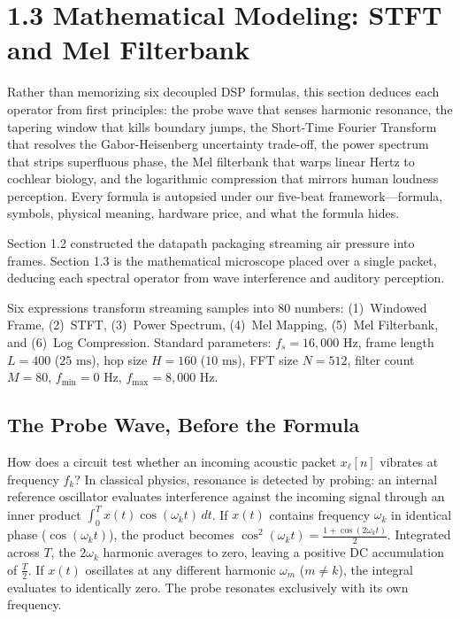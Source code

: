 \documentclass[11pt,a4paper]{article}
\begin{document}
\vspace*{-4.5mm}
\section*{1.3 Mathematical Modeling: STFT and Mel Filterbank}
\vspace{-2.5mm}

\begin{learningobj}
Rather than memorizing six decoupled DSP formulas, this section deduces each operator from first principles: the probe wave that senses harmonic resonance, the tapering window that kills boundary jumps, the Short-Time Fourier Transform that resolves the Gabor-Heisenberg uncertainty trade-off, the power spectrum that strips superfluous phase, the Mel filterbank that warps linear Hertz to cochlear biology, and the logarithmic compression that mirrors human loudness perception. Every formula is autopsied under our five-beat framework---formula, symbols, physical meaning, hardware price, and what the formula hides.
\end{learningobj}

\vspace{0.5mm}
Section 1.2 constructed the datapath packaging streaming air pressure into frames. Section 1.3 is the mathematical microscope placed over a single packet, deducing each spectral operator from wave interference and auditory perception.

Six expressions transform streaming samples into 80 numbers: (1)~Windowed Frame, (2)~STFT, (3)~Power Spectrum, (4)~Mel Mapping, (5)~Mel Filterbank, and (6)~Log Compression. Standard parameters: $f_s = 16{,}000\text{ Hz}$, frame length $L = 400$ ($25\text{ ms}$), hop size $H = 160$ ($10\text{ ms}$), FFT size $N = 512$, filter count $M = 80$, $f_{\min} = 0\text{ Hz}$, $f_{\max} = 8{,}000\text{ Hz}$.

\vspace{-1.5mm}
\subsection*{The Probe Wave, Before the Formula}
\vspace{-2mm}

How does a circuit test whether an incoming acoustic packet $x_\ell[n]$ vibrates at frequency $f_k$? In classical physics, resonance is detected by probing: an internal reference oscillator evaluates interference against the incoming signal through an inner product $\int_0^T x(t) \cos(\omega_k t) \, dt$. If $x(t)$ contains frequency $\omega_k$ in identical phase ($\cos(\omega_k t)$), the product becomes $\cos^2(\omega_k t) = \frac{1 + \cos(2\omega_k t)}{2}$. Integrated across $T$, the $2\omega_k$ harmonic averages to zero, leaving a positive DC accumulation of $\frac{T}{2}$. If $x(t)$ oscillates at any different harmonic $\omega_m$ ($m \ne k$), the integral evaluates to identically zero. The probe resonates exclusively with its own frequency.
\end{document}
